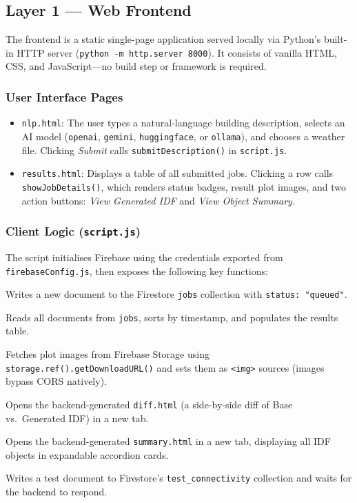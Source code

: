 \documentclass[12pt, a4paper]{article}
\begin{document}
\subsection{Layer 1 --- Web Frontend}

The frontend is a static single-page application served locally via Python's built-in HTTP server (\texttt{python -m http.server 8000}). It consists of vanilla HTML, CSS, and JavaScript---no build step or framework is required.

\subsubsection{User Interface Pages}
\begin{itemize}[nosep]
  \item \texttt{nlp.html}: The user types a natural-language building description, selects an AI model (\texttt{openai}, \texttt{gemini}, \texttt{huggingface}, or \texttt{ollama}), and chooses a weather file. Clicking \emph{Submit} calls \texttt{submitDescription()} in \texttt{script.js}.
  \item \texttt{results.html}: Displays a table of all submitted jobs. Clicking a row calls \texttt{showJobDetails()}, which renders status badges, result plot images, and two action buttons: \emph{View Generated IDF} and \emph{View Object Summary}.
\end{itemize}

\subsubsection{Client Logic (\texttt{script.js})}
The script initialises Firebase using the credentials exported from \texttt{firebaseConfig.js}, then exposes the following key functions:
\begin{description}[nosep, leftmargin=1.5cm, labelwidth=1.3cm]
  \item[\texttt{submitDescription()}] Writes a new document to the Firestore \texttt{jobs} collection with \texttt{status: "queued"}.
  \item[\texttt{loadJobs()}] Reads all documents from \texttt{jobs}, sorts by timestamp, and populates the results table.
  \item[\texttt{showJobDetails()}] Fetches plot images from Firebase Storage using \texttt{storage.ref().getDownloadURL()} and sets them as \texttt{<img>} sources (images bypass CORS natively).
  \item[\texttt{viewIDF()}] Opens the backend-generated \texttt{diff.html} (a side-by-side diff of Base vs.\ Generated IDF) in a new tab.
  \item[\texttt{viewIDFSummary()}] Opens the backend-generated \texttt{summary.html} in a new tab, displaying all IDF objects in expandable accordion cards.
  \item[\texttt{testAIConnection()}] Writes a test document to Firestore's \texttt{test\_connectivity} collection and waits for the backend to respond.
\end{description}
\end{document}
